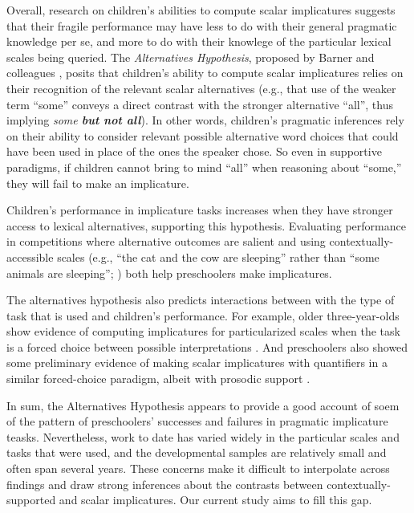 \documentclass[10pt,letterpaper]{article}
\begin{document}
Overall, research on children's abilities to compute scalar implicatures suggests that their fragile performance may have less to do with their general pragmatic knowledge per se, and more to do with their knowlege of the particular lexical scales being queried. The \emph{Alternatives Hypothesis}, proposed by Barner and colleagues \citep{barner2010, barner2011}, posits that children's ability to compute scalar implicatures relies on their recognition of the relevant scalar alternatives (e.g., that use of the weaker term ``some'' conveys a direct contrast with the stronger alternative ``all'', thus implying \emph{some \textbf{but not all}}).  In other words, children's pragmatic inferences rely on their ability to consider relevant possible alternative word choices that could have been used in place of the ones the speaker chose. So even in supportive paradigms, if children cannot bring to mind ``all'' when reasoning about ``some,'' they will fail to make an implicature.

Children's performance in implicature tasks increases when they have stronger access to lexical alternatives, supporting this hypothesis.  Evaluating performance in competitions where alternative outcomes are salient \citep{papafragou2003} and using contextually-accessible scales (e.g., ``the cat and the cow are sleeping'' rather than ``some animals are sleeping''; \cite{barner2011}) both help preschoolers make implicatures. 

The alternatives hypothesis also predicts interactions between with the type of task that is used and children's performance. For example, older three-year-olds show evidence of computing implicatures for particularized scales when the task is a forced choice between possible interpretations \citep{stiller2014}. And preschoolers also showed some preliminary evidence of making scalar implicatures with quantifiers in a similar forced-choice paradigm, albeit with prosodic support \citep{miller2005}. 

In sum, the Alternatives Hypothesis appears to provide a good account of soem of the pattern of preschoolers' successes and failures in pragmatic implicature teasks. Nevertheless, work to date has varied widely in the particular scales and tasks that were used, and the developmental samples are relatively small and often span several years. These concerns make it difficult to interpolate across findings and draw strong inferences about the contrasts between contextually-supported and scalar implicatures. Our current study aims to fill this gap. 
\end{document}
